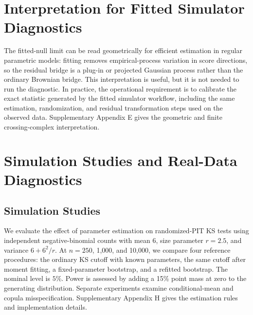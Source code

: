 \documentclass[preprint,12pt]{elsarticle}
\theoremstyle{plain}
\theoremstyle{remark}
\begin{document}
\section{Interpretation for Fitted Simulator Diagnostics}\label{sec:interpretation}

The fitted-null limit can be read geometrically for efficient estimation in
regular parametric models:
fitting removes empirical-process variation in score directions, so the
residual bridge is a plug-in or projected Gaussian process rather than the
ordinary Brownian bridge. This interpretation is useful, but it is not needed
to run the diagnostic. In practice, the operational requirement is to calibrate
the exact statistic generated by the fitted simulator workflow, including the
same estimation, randomization, and residual transformation steps used on the
observed data. Supplementary Appendix E gives the geometric and finite
crossing-complex interpretation.

\section{Simulation Studies and Real-Data Diagnostics}
\label{sec:simulation-studies}

\subsection{Simulation Studies}
\label{sec:simulations}

We evaluate the effect of parameter estimation on randomized-PIT KS tests
using independent negative-binomial counts with mean $6$, size parameter
$r=2.5$, and variance $6+6^2/r$. At $n=250$, 1,000, and 10,000, we compare
four reference procedures: the ordinary KS cutoff with known parameters,
the same cutoff after moment fitting, a fixed-parameter bootstrap, and a
refitted bootstrap. The nominal level is $5\%$. Power is assessed by adding a
15\% point mass at zero to the generating distribution. Separate experiments
examine conditional-mean and copula misspecification. Supplementary Appendix H
gives the estimation rules and implementation details.
\end{document}
